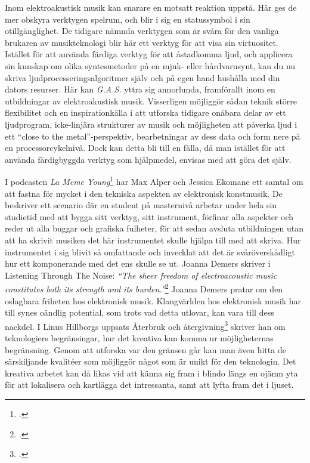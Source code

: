 \documentclass{article}
\begin{document}


Inom elektroakustisk musik kan snarare en motsatt reaktion uppstå. Här ges de mer obskyra verktygen spelrum,
och blir i sig en statussymbol i sin otillgänglighet. De tidigare nämnda verktygen som är svåra för den
vanliga brukaren av musikteknologi blir här ett verktyg för att visa sin virtuositet. Istället för att använda
färdiga verktyg för att åstadkomma ljud, och applicera sin kunskap om olika syntesmetoder på en mjuk- eller
hårdvarusynt, kan du nu skriva ljudprocesseringsalgoritmer själv och på egen hand hushålla med din dators
resurser. Här kan \emph{G.A.S.} yttra sig annorlunda, framförallt inom en utbildningar av elektroakustisk
musik. Visserligen möjliggör sådan teknik större flexibilitet och en inspirationkälla i att utforska tidigare
onåbara delar av ett ljudprogram, icke-linjära strukturer av musik och möjligheten att påverka ljud i ett
``close to the metal''-perspektiv, bearbetningar av dess data och form nere på en processorcykelnivå. Dock kan
detta bli till en fälla, då man istället för att använda färdigbyggda verktyg som hjälpmedel, envisas med att
göra det själv.

I podcasten \emph{La Meme Young}\footcite{LaMemeYoung} har Max Alper och Jessica Ekomane ett samtal
om att fastna för mycket i den tekniska aspekten av elektronisk konstmusik. De beskriver ett scenario där en
student på masternivå arbetar under hela sin studietid med att bygga sitt verktyg, sitt instrument, förfinar
alla aspekter och reder ut alla buggar och grafiska fulheter, för att sedan avsluta utbildningen utan att ha
skrivit musiken det här instrumentet skulle hjälpa till med att skriva. Hur instrumentet i sig blivit så
omfattande och invecklat att det är svåröverskådligt hur ett komponerande med det ens skulle se ut. Joanna Demers
skriver i Listening Through The Noise: \emph{``The sheer freedom of electroacoustic music constitutes both
its strength and its burden.''}\footcite{JoannaDemers} Joanna Demers pratar om den oslagbara friheten hos
elektronisk musik. Klangvärlden hos elektronisk musik har till synes oändlig potential, som trots vad detta
utlovar, kan vara till dess nackdel. I Linus Hillborgs uppsats Återbruk och
återgivning\footcite{LinusHillborg} skriver han om teknologiers begränsingar, hur det kreativa kan komma ur
möjligheternas begränsning. Genom att utforska var den gränsen går kan man även hitta de särskiljande
kvalitéer som möjliggör något som är unikt för den teknologin. Det kreativa arbetet kan då likas vid att känna
sig fram i blindo längs en ojämn yta för att lokalisera och kartlägga det intressanta, samt att lyfta fram det
i ljuset.
\end{document}
